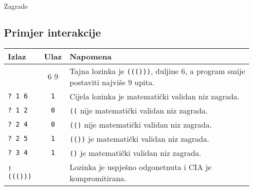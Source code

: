 \begin{statement}[
  problempoints=100,
  timelimit=1 sekunda,
  memorylimit=512 MiB,
]{Zagrade}
\subsection*{Primjer interakcije}
{\renewcommand{\arraystretch}{1.4}
  \setlength{\tabcolsep}{6pt}
  \begin{tabular}{lcl}
    Izlaz & Ulaz & Napomena \\ \midrule
      & 6 9 & Tajna lozinka je \texttt{((()))}, duljine 6, a program smije postaviti najviše $9$ upita. \\
    \texttt{\frenchspacing? 1 6} & \texttt{1} & Cijela lozinka je matematički validan niz zagrada. \\
    \texttt{\frenchspacing? 1 2} & \texttt{0} & \texttt{((} nije matematički validan niz zagrada. \\
    \texttt{\frenchspacing? 2 4} & \texttt{0} & \texttt{(()} nije matematički validan niz zagrada. \\
    \texttt{\frenchspacing? 2 5} & \texttt{1} & \texttt{(())} je matematički validan niz zagrada. \\
    \texttt{\frenchspacing? 3 4} & \texttt{1} & \texttt{()} je matematički validan niz zagrada. \\
    \texttt{\frenchspacing! ((()))} & & Lozinka je uspješno odgonetnuta i CIA je kompromitirana. \\
\end{tabular}}

\end{statement}

